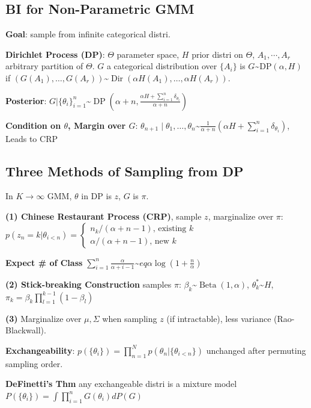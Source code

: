 \subsection*{BI for Non-Parametric GMM}
\textbf{Goal}: sample from infinite categorical distri.

\textbf{Dirichlet Process (DP)}: $\Theta$ parameter space, $H$ prior distri on $\Theta$, $A_1, \cdots, A_r$ arbitrary partition of $\Theta$. $G$ a categorical distribution over $\{A_i\}$ is  $G $\textasciitilde$ \mathrm{DP}(\alpha, H)$ if $\left(G\left(A_{1}\right), \ldots, G\left(A_{r}\right)\right) $\textasciitilde$ \operatorname{Dir}\left(\alpha H\left(A_{1}\right), \ldots, \alpha H\left(A_{r}\right)\right)$.

\textbf{Posterior}: $G | \{\theta_{i}\}_{i=1}^n $\textasciitilde$ \operatorname{DP}\left(\alpha+n, \frac{\alpha H + \sum_{i=1}^{n} \delta_{\theta_{i}}}{\alpha+n}\right)$

\textbf{Condition on $\theta$, Margin over $G$}: $\theta_{n+1} \mid \theta_{1}, \ldots, \theta_{n} $\textasciitilde$ \frac{1}{\alpha+n}\left(\alpha H+\sum_{i=1}^{n} \delta_{\theta_{i}}\right)$, Leads to CRP

\subsection*{Three Methods of Sampling from DP}

In $K\to\infty$ GMM, $\theta$ in DP is $z$, $G$ is $\pi$. 

\textbf{(1) Chinese Restaurant Process (CRP)}, sample $z$, marginalize over $\pi$: \\
$p(z_n = k| \theta_{i < n}) = 
\begin{cases}
    n_k / (\alpha + n - 1) \text{, existing }k \\
    \alpha / (\alpha + n - 1) \text{, new }k 
\end{cases}
$

\textbf{Expect \# of Class} $\sum_{i=1}^{n} \frac{\alpha}{\alpha+i-1} $\textasciitilde$eq \alpha \log \left(1+\frac{n}{\alpha}\right)$

\textbf{(2) Stick-breaking Construction} samples $\pi$: $\beta_{k} $\textasciitilde$ \operatorname{Beta}(1, \alpha)$, $\theta_{k}^{*} $\textasciitilde$ H$, $\pi_{k}=\beta_{k} \prod_{l=1}^{k-1}\left(1-\beta_{l}\right)$

\textbf{(3)} Marginalize over $\mu, \Sigma$ when sampling $z$ (if intractable), less variance (Rao-Blackwall).

\textbf{Exchangeability}: $p(\{\theta_i\}) = \prod_{n=1}^N p(\theta_n | \{\theta_{i<n}\})$ unchanged after permuting sampling order.

\textbf{DeFinetti’s Thm} any exchangeable distri is a mixture model $P\left(\{\theta_{i}\}\right)=\int \prod_{i=1}^{n} G\left(\theta_{i}\right) d P(G)$
